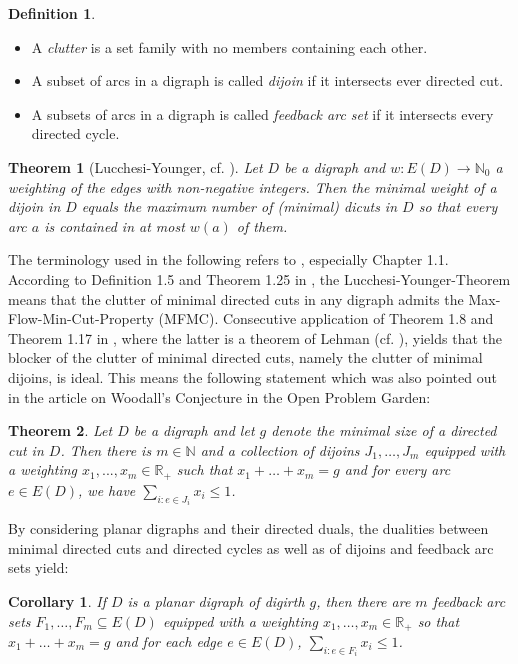 \documentclass[fontsize=11pt,a4paper,DIV12]{scrartcl}
\theoremstyle{meiner}
\newtheorem{theorem}{Theorem}
\newtheorem{corollary}{Corollary}
\theoremstyle{definition}
\newtheorem{definition}{Definition}
\begin{document}
\begin{definition}
\noindent
\begin{itemize}
\item A  \emph{clutter} is a set family with no members containing each other.
\item A subset of arcs in a digraph is called \emph{dijoin} if it intersects ever directed cut.
\item A subsets of arcs in a digraph is called \emph{feedback arc set} if it intersects every directed cycle.
\end{itemize}
\end{definition} 
\begin{theorem}[Lucchesi-Younger, cf. \cite{lucchesiyounger}]
Let $D$ be a digraph and $w:E(D) \rightarrow \mathbb{N}_0$ a weighting of the edges with non-negative integers. Then the minimal weight of a dijoin in $D$ equals the maximum number of (minimal) dicuts in $D$ so that every arc $a$ is contained in at most $w(a)$ of them. 
\end{theorem}
The terminology used in the following refers to \cite{corn}, especially Chapter 1.1. According to Definition 1.5 and Theorem 1.25 in \cite{corn}, the Lucchesi-Younger-Theorem means that the clutter of minimal directed cuts in any digraph admits the Max-Flow-Min-Cut-Property (MFMC). Consecutive application of Theorem 1.8 and Theorem 1.17 in \cite{corn}, where the latter is a theorem of Lehman (cf. \cite{lehman}), yields that the blocker of the clutter of minimal directed cuts, namely the clutter of minimal dijoins, is ideal. This means the following statement which was also pointed out in the article \cite{OPG} on Woodall's Conjecture in the Open Problem Garden:
\begin{theorem}
Let $D$ be a digraph and let $g$ denote the minimal size of a directed cut in $D$. Then there is $m \in \mathbb{N}$ and a collection of dijoins $J_1,\ldots,J_m$ equipped with a weighting $x_1,...,x_m \in \mathbb{R}_+$ such that $x_1+\ldots+x_m=g$ and for every arc $e \in E(D)$, we have $\sum_{i: e \in J_i}{x_i} \leq 1$. 
\end{theorem}
By considering planar digraphs and their directed duals, the dualities between minimal directed cuts and directed cycles as well as of dijoins and feedback arc sets yield:
\begin{corollary} \label{DeVosPlanar}
If $D$ is a planar digraph of digirth $g$, then there are $m$ feedback arc sets $F_1,\ldots,F_m \subseteq E(D)$ equipped with a weighting $x_1,\ldots,x_m \in \mathbb{R}_+$ so that $x_1+\ldots+x_m=g$ and for each edge $e \in E(D)$, $\sum_{i: e \in F_i}{x_i} \leq 1$.
\end{corollary}
\end{document}
